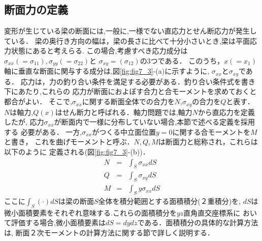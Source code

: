 \documentclass[10pt,a4j]{jarticle}
\begin{document}
\subsection{断面力の定義}
変形が生じている梁の断面には,一般に,一様でない直応力とせん断応力が発生している．
梁の奥行き方向の幅は，梁の長さに比べて十分小さいとき,梁は平面応力状態にあると考えらる.
この場合,考慮すべき応力成分は
$\sigma_{xx}(=\sigma_{11}),\sigma_{yy}(=\sigma_{22})$と
$\sigma_{xy}=(\sigma_{12})$の3つである．
このうち，$x(=x_1)$軸に垂直な断面に関与する成分は,図\ref{fig:fig7_3}-(a)に示すように,
$\sigma_{xx}$と$\sigma_{xy}$である．
応力は，力の釣り合い条件を満足する必要がある．釣り合い条件式を書き下にあたり,これらの
応力が断面におよぼす合力と合モーメントを求めておくと都合がよい．
そこで,$\sigma_{xx}$に関する断面全体での合力を$N$,$\sigma_{xy}$の合力を$Q$と表す．
$N$は軸力,$Q(x)$はせん断力と呼ばれる．軸力問題では,軸力$N$から直応力を定義したが,
応力$\sigma_{xx}$が断面内で一様に分布していない場合,本節で述べる定義を採用する
必要がある．
一方,$\sigma_{xx}$がつくる中立面位置$y=0$に関する合モーメントを$M$と書き，
これを曲げモーメントと呼ぶ．$N,Q,M$は断面力と総称され，これらは以下のように
定義される(図\ref{fig:fig7_3}-(b))．
\begin{eqnarray}
	N &=& \int_S \sigma_{xx} dS 
	\label{eqn:def_N}\\
	Q &=& \int_S \sigma_{xy} dS
	\label{eqn:def_Q}\\
	M &=& \int_S y\sigma_{xx} dS
	\label{eqn:def_M}
\end{eqnarray}
ここに$\int_S(\cdot)dS$は梁の断面$S$全体を積分範囲とする面積積分(２重積分)を, 
$dS$は微小面積要素をそれぞれ意味する.これらの面積積分を$yz$直角直交座標系に
おいて評価する場合,微小面積要素は$dS=dydz$である．面積積分の具体的な計算方法は,
断面２次モーメントの計算方法に関する節で詳しく説明する．
\end{document}
